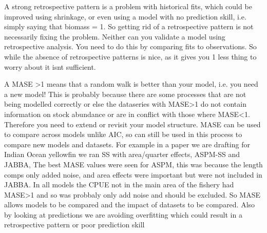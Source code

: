 A strong retrospective pattern is a problem with historical fits, which could be improved using shrinkage, or even using a model with no prediction skill, i.e. simply saying that biomass = 1. So getting rid of a retrospective pattern is not necessarily fixing the problem. Neither can you validate a model using retrospective analysis. You need to do this by comparing fits to observations. So while the absence of retrospective patterns is nice, as it gives you 1 less thing to worry about it isnt sufficient.

A MASE >1 means that a random walk is better than your model, i.e. you need a new model! This is probably because there are some processes that are not being modelled correctly or else the dataseries with MASE>1 do not contain information on stock abundance or are in conflict with those where MASE<1. Therefore you need to extend or revisit your model structure. MASE can be used to compare across models unlike AIC, so can still be used in this process to compare new models and datasets. For example in a paper we are drafting for Indian Ocean yellowfin we ran SS with area/quarter effects, ASPM-SS and JABBA, The best MASE values were seen for ASPM, this was because the length comps only added noise, and area effects were important but were not included in JABBA. In all  models the CPUE not in the main area of the fishery had MASE>1 and so was probbaly only add noise and should be excluded. So MASE allows models to be compared and the impact of datasets to be compared. Also by looking at predictions we are avoiding overfitting which could result in a retrospective pattern or poor prediction skill 
\
\fi